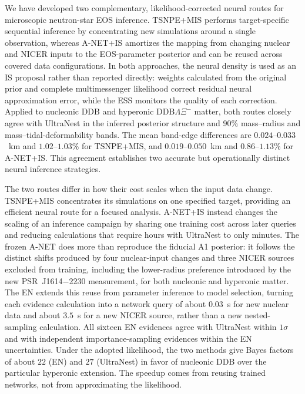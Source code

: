 \documentclass[aps,prd,twocolumn,superscriptaddress,nofootinbib,longbibliography]{revtex4-2}
\begin{document}
We have developed two complementary, likelihood-corrected
neural routes for microscopic neutron-star EOS inference. TSNPE+MIS performs
target-specific sequential inference by concentrating new simulations around a
single observation, whereas A-NET+IS amortizes the mapping from changing
nuclear and NICER inputs to the EOS-parameter posterior and can be reused
across covered data configurations. In both approaches, the neural density is
used as an IS proposal rather than reported directly: weights
calculated from the original prior and complete multimessenger likelihood
correct residual neural approximation error, while the ESS
monitors the quality of each correction. Applied to nucleonic DDB
and hyperonic DDB$\Lambda\Xi^-$ matter, both routes closely agree with
UltraNest in the inferred posterior structure and 90\% mass--radius and
mass--tidal-deformability bands. The mean band-edge
differences are $0.024$--$0.033$~km and $1.02$--$1.03\%$ for TSNPE+MIS, and
$0.019$--$0.050$~km and $0.86$--$1.13\%$ for A-NET+IS. This agreement
establishes two accurate but operationally distinct
neural inference strategies.

The two routes differ in how their cost
scales when the input data change. TSNPE+MIS concentrates its simulations on
one specified target, providing an efficient neural route for a focused
analysis. A-NET+IS instead changes the scaling of an inference campaign by
sharing one training cost across later queries and reducing calculations that
require hours with UltraNest to only minutes. The frozen A-NET does more than
reproduce the fiducial A1 posterior: it follows the distinct shifts produced by
four nuclear-input changes and three NICER sources excluded from training,
including the lower-radius preference introduced by the new PSR~J1614$-$2230
measurement, for both nucleonic and hyperonic matter. The
EN extends this reuse from parameter inference to model
selection, turning each evidence calculation into a network
query of about $0.03$~s for new nuclear data and about $3.5$~s for a new NICER
source, rather than a new nested-sampling calculation. All sixteen EN evidences
agree with UltraNest within $1\sigma$ and with independent importance-sampling evidences within the EN uncertainties. Under
the adopted likelihood, the two methods give Bayes factors of about $22$ (EN) and $27$ (UltraNest) in
favor of nucleonic DDB over the particular hyperonic extension. The speedup comes from reusing trained
networks, not from approximating the likelihood.
\end{document}
